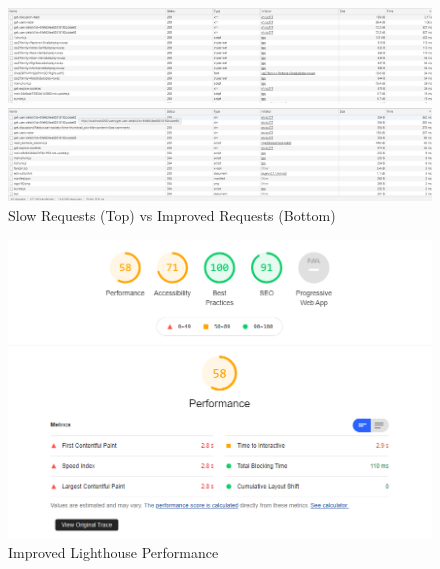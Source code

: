 \begin{figure}[H]
  \centering
  \includegraphics[scale=0.4]{img/slow_network_times.jpg}
  
  \newline
  
  \includegraphics[scale=0.4]{img/improved_network_times.jpg}
  \caption{Slow Requests (Top) vs Improved Requests (Bottom)}
  \label{fig:slow_network}
\end{figure}

\begin{figure}[H]
  \centering
  \includegraphics[scale=0.65]{img/improved_lighthouse.jpg}
  \caption{Improved Lighthouse Performance}
  \label{fig:improved_lighthouse}
\end{figure}

\newline

